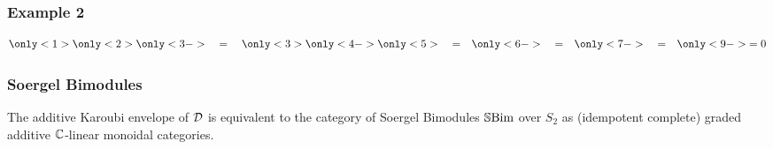 \begin{frame}
    \frametitle{Example 2}

    \begin{gather*}
        \only<1>{
            
        }
        \only<2>{
            
        }
        \only<3->{
            
            \quad = \quad
            \only<3>{
                
            }
            \only<4->{
                
            }
            \only<5>{
                \quad = \quad
                
            }
            \only<6->{
                \quad = \quad
                
            }
            \only<7->{
                \quad = \quad
                
            }
            \only<9->{
                = 0
            }
        }
    \end{gather*}

\end{frame}


\begin{frame}
    \frametitle{Soergel Bimodules}

    \begin{theorem}
        The additive Karoubi envelope of $\mathcal{D}$ is equivalent to the category of Soergel Bimodules $\operatorname{\mathbb{S}Bim}$ over $S_2$ as (idempotent complete) graded additive $\mathbb{C}$-linear monoidal categories.
    \end{theorem}
\end{frame}


